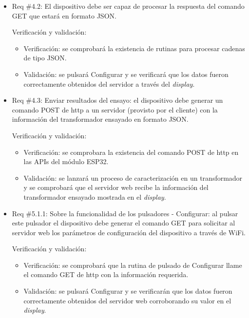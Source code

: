 \documentclass[11pt]{charter}
\begin{document}
\begin{itemize} 
\item Req \#4.2: El dispositivo debe ser capaz de procesar la respuesta del comando GET que estará en formato JSON.

Verificación y validación:

\begin{itemize}
\item Verificación: se comprobará la existencia de rutinas para procesar cadenas de tipo JSON.
\item Validación: se pulsará Configurar y se verificará que los datos fueron correctamente obtenidos del servidor a través del \textit{display}.
\end{itemize}

\end{itemize}

\begin{itemize} 
\item Req \#4.3: Enviar resultados del ensayo: el dispositivo debe generar un comando POST de http a un servidor (provisto por el cliente) con la información del transformador ensayado en formato JSON.

Verificación y validación:

\begin{itemize}
\item Verificación: se comprobara la existencia del comando POST de http en las APIs del módulo ESP32. 
\item Validación: se lanzará un proceso de caracterización en un transformador y se comprobará que el servidor web recibe la información del transformador ensayado mostrada en el \textit{display}.
\end{itemize}

\end{itemize}

\begin{itemize} 
\item Req \#5.1.1: Sobre la funcionalidad de los pulsadores - Configurar: al pulsar este pulsador el dispositivo debe generar el comando GET para solicitar al servidor web los parámetros de configuración del dispositivo a través de WiFi.

Verificación y validación:

\begin{itemize}
\item Verificación: se comprobará que la rutina de pulsado de Configurar llame el comando GET de http con la información requerida. 
\item Validación: se pulsará Configurar y se verificarán que los datos fueron correctamente obtenidos del servidor web corroborando su valor en el \textit{display}.
\end{itemize}

\end{itemize}
\end{document}

